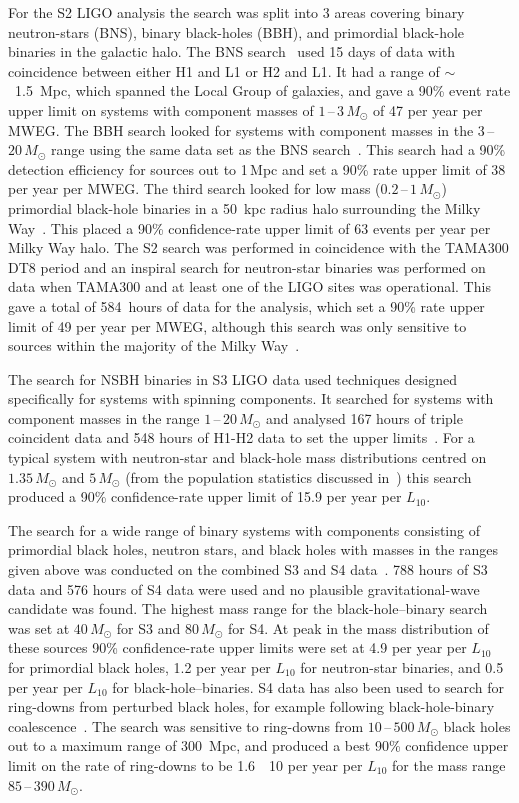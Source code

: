 For the S2 LIGO analysis the search was split into 3 areas covering binary neutron-stars (BNS), binary 
black-holes (BBH), and primordial black-hole binaries in the galactic halo. The BNS 
search~\cite{Abbott:2005b} used 15 days of data with coincidence between either H1 and L1 or H2 and L1. It 
had a range of $\sim$~1.5~Mpc, which spanned the Local Group of galaxies, and gave a 90\% event rate upper 
limit on systems with component masses of $1$\,--\,$3\,M_{\odot}$ of 47 per year per MWEG. The BBH search 
looked for systems with component masses in the $3$\,--\,$20\,M_{\odot}$ range using the same data set as the 
BNS search~\cite{Abbott:2006a}. This search had a 90\% detection efficiency for sources 
out to 1\,Mpc and set a 90\% rate upper limit of 38 per year per MWEG. The third search looked for low mass 
($0.2$\,--\,$1\,M_{\odot}$) primordial black-hole binaries in a 50~kpc radius halo surrounding the Milky 
Way~\cite{Abbott:2005e}. This placed a 90\% confidence-rate upper limit of 63 events per year per Milky Way 
halo. The S2 search was performed in coincidence with the TAMA300 DT8 period and an inspiral search for 
neutron-star binaries was performed on data when TAMA300 and at least one of the LIGO sites was operational. 
This gave a total of 584~hours of data for the analysis, which set a 90\% rate upper limit of 49 per year per 
MWEG, although this search was only sensitive to sources within the majority of the Milky 
Way~\cite{Abbott:2006b}.

The search for NSBH binaries in S3 LIGO data used techniques designed specifically for systems with spinning 
components. It searched for systems with component masses in the range $1$\,--\,$20\,M_{\odot}$ and analysed 
167 hours of triple coincident data and 548 hours of H1-H2 data to set the upper limits~\cite{Abbott:2008d}. 
For a typical system with neutron-star and black-hole mass distributions centred on $1.35\,M_{\odot}$ and 
$5\,M_{\odot}$ (from the population statistics discussed in~\cite{Abbott:2008a}) this search produced a 90\% 
confidence-rate upper limit of 15.9 per year per $L_{10}$.

The search for a wide range of binary systems with components consisting of primordial black holes, neutron 
stars, and black holes with masses in the ranges given above was conducted on the combined S3 and S4 
data~\cite{Abbott:2008a}. 788 hours of S3 data and 576 hours of S4 data were used and no plausible
gravitational-wave candidate was found. The highest mass range for the black-hole--binary search was set at 
$40\,M_{\odot}$ for S3 and $80\,M_{\odot}$ for S4. At peak in the mass distribution of these sources 90\% 
confidence-rate upper limits were set at 4.9 per year per $L_{10}$ for primordial black holes, 1.2 per year 
per $L_{10}$ for neutron-star binaries, and 0.5 per year per $L_{10}$ for black-hole--binaries. S4 data has 
also been used to search for ring-downs from perturbed black holes, for example following black-hole-binary 
coalescence~\cite{Abbott:2009g}. The search was sensitive to ring-downs from $10$\,--\,$500\,M_{\odot}$ black 
holes out to a maximum range of 300~Mpc, and produced a best 90\% confidence upper limit on the rate of 
ring-downs to be 1.6~\texttimes~10 per year per $L_{10}$ for the mass range 
$85$\,--\,$390\,M_{\odot}$.

